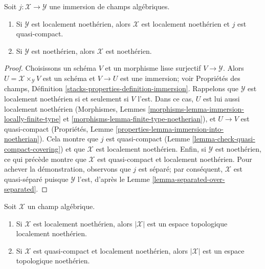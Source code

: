 \begin{lemma}
\label{lemma-locally-closed-in-noetherian}
Soit $j : \mathcal{X} \to \mathcal{Y}$ une immersion de champs algébriques.
\begin{enumerate}
\item Si $\mathcal{Y}$ est localement noethérien, alors
$\mathcal{X}$ est localement noethérien et $j$ est quasi-compact.
\item Si $\mathcal{Y}$ est noethérien, alors $\mathcal{X}$ est noethérien.
\end{enumerate}
\end{lemma}

\begin{proof}
Choisissons un schéma $V$ et un morphisme lisse surjectif
$V \to \mathcal{Y}$. Alors $U = \mathcal{X} \times_\mathcal{Y} V$ est un
schéma et $V \to U$ est une immersion; voir Propriétés des champs,
Définition \ref{stacks-properties-definition-immersion}. Rappelons que
$\mathcal{Y}$ est localement noethérien si et seulement si $V$ l'est. Dans ce
cas, $U$ est lui aussi localement noethérien (Morphismes, Lemmes
\ref{morphisms-lemma-immersion-locally-finite-type} et
\ref{morphisms-lemma-finite-type-noetherian}), et $U \to V$ est quasi-compact
(Propriétés, Lemme \ref{properties-lemma-immersion-into-noetherian}). Cela
montre que $j$ est quasi-compact
(Lemme \ref{lemma-check-quasi-compact-covering}) et que $\mathcal{X}$ est
localement noethérien. Enfin, si $\mathcal{Y}$ est noethérien, ce qui précède
montre que $\mathcal{X}$ est quasi-compact et localement noethérien. Pour
achever la démonstration, observons que $j$ est séparé; par conséquent,
$\mathcal{X}$ est quasi-séparé puisque $\mathcal{Y}$ l'est, d'après le
Lemme \ref{lemma-separated-over-separated}.
\end{proof}

\begin{lemma}
\label{lemma-Noetherian-topology}
Soit $\mathcal{X}$ un champ algébrique.
\begin{enumerate}
\item Si $\mathcal{X}$ est localement noethérien, alors $|\mathcal{X}|$ est
un espace topologique localement noethérien.
\item Si $\mathcal{X}$ est quasi-compact et localement noethérien, alors
$|\mathcal{X}|$ est un espace topologique noethérien.
\end{enumerate}
\end{lemma}

